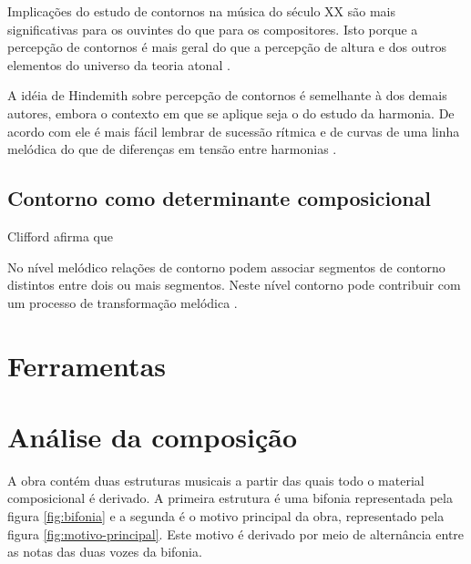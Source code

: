Implicações do estudo de contornos na música do século XX são mais
significativas para os ouvintes do que para os compositores. Isto
porque a percepção de contornos é mais geral do que a percepção de
altura e dos outros elementos do universo da teoria atonal
\cite[p. 224]{friedmann85:methodology}.

A idéia de Hindemith sobre percepção de contornos é semelhante à dos
demais autores, embora o contexto em que se aplique seja o do estudo
da harmonia. De acordo com ele é mais fácil lembrar de sucessão
rítmica e de curvas de uma linha melódica do que de diferenças em
tensão entre harmonias \cite[p. 175]{hindemith41:craft}.

\section{Contorno como determinante composicional}
\label{sec:cont-como-determ}

Clifford afirma que



No nível melódico relações de contorno podem associar segmentos de
contorno distintos entre dois ou mais segmentos. Neste nível contorno
pode contribuir com um processo de transformação melódica
\cite[p. 159]{clifford95:contour}.

\chapter{Ferramentas}
\label{cha:ferramentas}

\chapter{Análise da composição}
\label{cha:anal-da-comp}

A obra contém duas estruturas musicais a partir das quais todo o
material composicional é derivado. A primeira estrutura é uma bifonia
representada pela figura \ref{fig:bifonia} e a segunda é o motivo
principal da obra, representado pela figura
\ref{fig:motivo-principal}. Este motivo é derivado por meio de
alternância entre as notas das duas vozes da bifonia.

